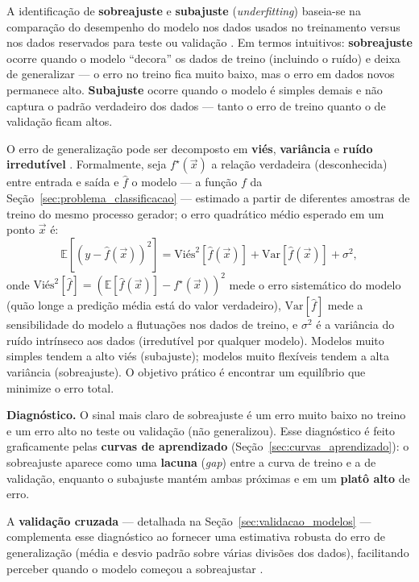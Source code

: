 A identificação de \textbf{sobreajuste} e \textbf{subajuste} (\textit{underfitting}) baseia-se na comparação do desempenho do modelo nos dados usados no treinamento versus nos dados reservados para teste ou validação \citep{geron2019maos}. Em termos intuitivos: \textbf{sobreajuste} ocorre quando o modelo ``decora'' os dados de treino (incluindo o ruído) e deixa de generalizar --- o erro no treino fica muito baixo, mas o erro em dados novos permanece alto. \textbf{Subajuste} ocorre quando o modelo é simples demais e não captura o padrão verdadeiro dos dados --- tanto o erro de treino quanto o de validação ficam altos. 

O erro de generalização pode ser decomposto em \textbf{viés}, \textbf{variância} e \textbf{ruído irredutível} \citep{Deisenroth2019, Levada2026}. Formalmente, seja $f^\star(\vec{x})$ a relação verdadeira (desconhecida) entre entrada e saída e $\hat{f}$ o modelo --- a função $f$ da Seção~\ref{sec:problema_classificacao} --- estimado a partir de diferentes amostras de treino do mesmo processo gerador; o erro quadrático médio esperado em um ponto $\vec{x}$ é:
\begin{equation}
\mathbb{E}\!\left[(y - \hat{f}(\vec{x}))^2\right] = \text{Viés}^2[\hat{f}(\vec{x})] + \text{Var}[\hat{f}(\vec{x})] + \sigma^2,
\label{eq:bias_variance}
\end{equation}
onde $\text{Viés}^2[\hat{f}] = \left(\mathbb{E}[\hat{f}(\vec{x})] - f^\star(\vec{x})\right)^2$ mede o erro sistemático do modelo (quão longe a predição média está do valor verdadeiro), $\text{Var}[\hat{f}]$ mede a sensibilidade do modelo a flutuações nos dados de treino, e $\sigma^2$ é a variância do ruído intrínseco aos dados (irredutível por qualquer modelo). Modelos muito simples tendem a alto viés (subajuste); modelos muito flexíveis tendem a alta variância (sobreajuste). O objetivo prático é encontrar um equilíbrio que minimize o erro total.

\textbf{Diagnóstico.} O sinal mais claro de sobreajuste é um erro muito baixo no treino e um erro alto no teste ou validação (não generalizou). Esse diagnóstico é feito graficamente pelas \textbf{curvas de aprendizado} (Seção~\ref{sec:curvas_aprendizado}): o sobreajuste aparece como uma \textbf{lacuna} (\textit{gap}) entre a curva de treino e a de validação, enquanto o subajuste mantém ambas próximas e em um \textbf{platô alto} de erro.

A \textbf{validação cruzada} --- detalhada na Seção~\ref{sec:validacao_modelos} --- complementa esse diagnóstico ao fornecer uma estimativa robusta do erro de generalização (média e desvio padrão sobre várias divisões dos dados), facilitando perceber quando o modelo começou a sobreajustar \citep{geron2019maos}.

